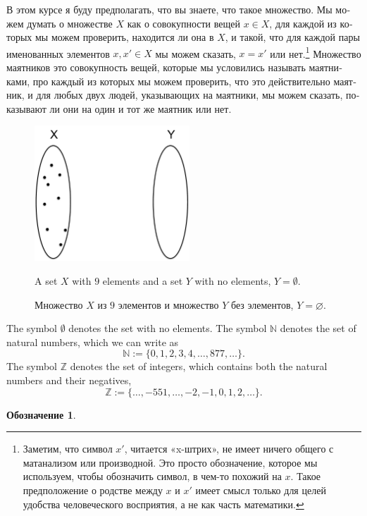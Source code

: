 \documentclass[a4paper]{book}
\def\ZZ{{\mathbb Z}}
\def\NN{{\mathbb N}}
\theoremstyle{myth}
\newtheorem{notationENG}[envENG]{\begin{english}Notation\end{english}}
\newtheorem{notationRUS}[envRUS]{Обозначение}
\begin{document}
\begin{russian}
В этом курсе я буду предполагать, что вы знаете, что такое множество. Мы можем думать о множестве $X$ как о совокупности вещей $x\in X$, для каждой из которых мы можем проверить, находится ли она в $X$, и такой, что для каждой пары именованных элементов $x,x'\in X$ мы можем сказать, $x=x'$ или нет.\footnote{Заметим, что символ $x'$, читается «x-штрих», не имеет ничего общего с матанализом или производной. Это просто обозначение, которое мы используем, чтобы обозначить символ, в чем-то похожий на $x$. Такое предположение о родстве между $x$ и $x'$ имеет смысл только для целей удобства человеческого восприятия, а не как часть математики.}
Множество маятников это совокупность вещей, которые мы условились называть маятниками, про каждый из которых мы можем проверить, что это действительно маятник, и для любых двух людей, указывающих на маятники, мы можем сказать, показывают ли они на один и тот же маятник или нет. 

\begin{figure}
\begin{center}
\includegraphics[height=2in]{aSet}
\end{center}
\caption{A set $X$ with $9$ elements and a set $Y$ with no elements, $Y=\emptyset$.}
\caption{Множество $X$ из $9$ элементов и множество $Y$ без элементов, $Y=\varnothing$.}
\end{figure}

\begin{notationENG}\label{not:basic math notation}
The symbol $\emptyset$ denotes the set with no elements. The symbol $\NN$\index{a symbol!$\NN$} denotes the set of natural numbers, which we can write as 
$$\NN:=\{0,1,2,3,4,\ldots,877,\ldots\}.$$
The symbol $\ZZ$\index{a symbol!$\ZZ$} denotes the set of integers, which contains both the natural numbers and their negatives, 
$$\ZZ:=\{\ldots,-551,\ldots,-2,-1,0,1,2,\ldots\}.$$ 
\end{notationENG}
\begin{notationRUS}\label{not:basic math notation}


\end{notationRUS}
\end{russian}
\end{document}
